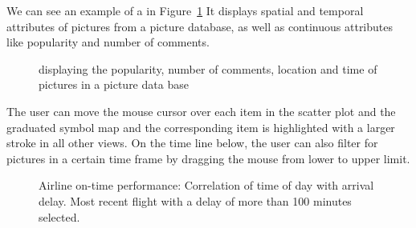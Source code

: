 We can see an example of a \cmv{} in Figure~\ref{fig:related-work:cmv}
It displays spatial and temporal attributes of pictures from a picture database, as well as continuous attributes like popularity and number of comments.
\begin{figure}[h]
  \centering
  \caption{\cmv{} displaying the popularity, number of comments, location and time of pictures in a picture data base}\label{fig:related-work:cmv}
\end{figure}
The user can move the mouse cursor over each item in the scatter plot and the graduated symbol map and the corresponding item is highlighted with a larger stroke in all other views.
On the time line below, the user can also filter for pictures in a certain time frame by dragging the mouse from lower to upper limit.

\begin{figure}[h]
  \centering
  \caption{Airline on-time performance: Correlation of time of day with arrival delay. Most recent flight with a delay of more than 100 minutes selected.}\label{fig:research:brushing-linking}
\end{figure}

